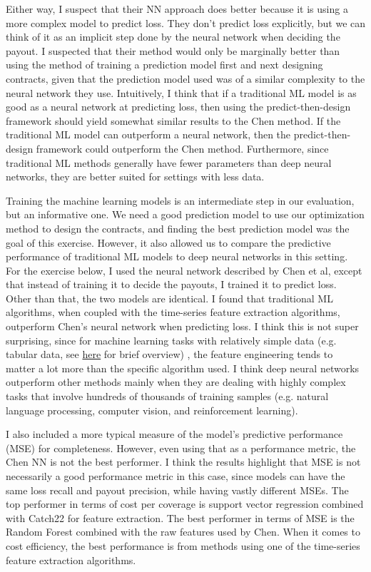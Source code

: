\documentclass[11pt]{article}
\begin{document}
  Either way, I suspect that their NN approach does better because it is using a more complex model to predict loss. They don't predict loss explicitly, but we can think of it as an implicit step done by the neural network when deciding the payout. I suspected that their method would only be marginally better than using the method of training a prediction model first and next designing contracts, given that the prediction model used was of a similar complexity to the neural network they use. Intuitively, I think that if a traditional ML model is as good as a neural network at predicting loss, then using the predict-then-design framework should yield somewhat similar results to the Chen method. If the traditional ML model can outperform a neural network, then the predict-then-design framework could outperform the Chen method. Furthermore, since traditional ML methods generally have fewer parameters than deep neural networks, they are better suited for settings with less data. 

  Training the machine learning models is an intermediate step in our evaluation, but an informative one. We need a good prediction model to use our optimization method to design the contracts, and finding the best prediction model was the goal of this exercise. However, it also allowed us to compare the predictive performance of traditional ML models to deep neural networks in this setting. For the exercise below, I used the neural network described by Chen et al, except that instead of training it to decide the payouts, I trained it to predict loss. Other than that, the two models are identical. I found that traditional ML algorithms, when coupled with the time-series feature extraction algorithms, outperform Chen's neural network when predicting loss. I think this is not super surprising, since for machine learning tasks with relatively simple data (e.g. tabular data, see \href{https://aws.amazon.com/compare/the-difference-between-machine-learning-and-deep-learning/}{here} for brief overview) , the feature engineering tends to matter a lot more than the specific algorithm used. I think deep neural networks outperform other methods mainly when they are dealing with highly complex tasks that involve hundreds of thousands of training samples (e.g. natural language processing, computer vision, and reinforcement learning). 

  I also included a more typical measure of the model's predictive performance (MSE) for completeness. However, even using that as a performance metric, the Chen NN is not the best performer. I think the results highlight that MSE is not necessarily a good performance metric in this case, since models can have the same loss recall and payout precision, while having vastly different MSEs. The top performer in terms of cost per coverage is support vector regression combined with Catch22 for feature extraction. The best performer in terms of MSE is the Random Forest combined with the raw features used by Chen. When it comes to cost efficiency, the best performance is from methods using one of the time-series feature extraction algorithms. 
\end{document}
